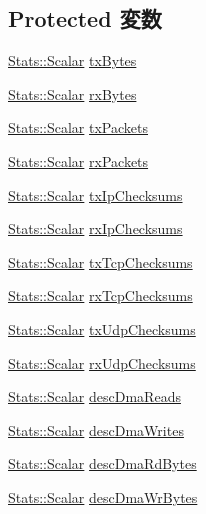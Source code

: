 \subsection*{Protected 変数}
\begin{DoxyCompactItemize}
\item 
\hyperlink{classStats_1_1Scalar}{Stats::Scalar} \hyperlink{classEtherDevice_abbcbcdf8c27d517363ead6a7f6d26e0d}{txBytes}
\item 
\hyperlink{classStats_1_1Scalar}{Stats::Scalar} \hyperlink{classEtherDevice_a715fc1a9e846c381ddd90bd12b0e28d0}{rxBytes}
\item 
\hyperlink{classStats_1_1Scalar}{Stats::Scalar} \hyperlink{classEtherDevice_a954bf8127dea683de5f15cb0e2103657}{txPackets}
\item 
\hyperlink{classStats_1_1Scalar}{Stats::Scalar} \hyperlink{classEtherDevice_a584f3731c2a58f40585474fab9b080b2}{rxPackets}
\item 
\hyperlink{classStats_1_1Scalar}{Stats::Scalar} \hyperlink{classEtherDevice_ab8fd14604893c8e4a3972f2fdf9501e1}{txIpChecksums}
\item 
\hyperlink{classStats_1_1Scalar}{Stats::Scalar} \hyperlink{classEtherDevice_a8ef538bf2e629f31a94678016ee92ddf}{rxIpChecksums}
\item 
\hyperlink{classStats_1_1Scalar}{Stats::Scalar} \hyperlink{classEtherDevice_a5eb11fbceeba64f33c20a6f83d47fa4c}{txTcpChecksums}
\item 
\hyperlink{classStats_1_1Scalar}{Stats::Scalar} \hyperlink{classEtherDevice_a6e12a524415fd313cc9a396fa1f4addb}{rxTcpChecksums}
\item 
\hyperlink{classStats_1_1Scalar}{Stats::Scalar} \hyperlink{classEtherDevice_aa1217365fc3caee57fb3a21d3a51b237}{txUdpChecksums}
\item 
\hyperlink{classStats_1_1Scalar}{Stats::Scalar} \hyperlink{classEtherDevice_a17a288e255ab7c2ef29580d9aa1ddfe5}{rxUdpChecksums}
\item 
\hyperlink{classStats_1_1Scalar}{Stats::Scalar} \hyperlink{classEtherDevice_a869f718813408dc21677a8b4eda22ad7}{descDmaReads}
\item 
\hyperlink{classStats_1_1Scalar}{Stats::Scalar} \hyperlink{classEtherDevice_adc4b53fc1cc0eabdd288107ea65dacef}{descDmaWrites}
\item 
\hyperlink{classStats_1_1Scalar}{Stats::Scalar} \hyperlink{classEtherDevice_ae33ce7a1d1a501ce77ffed2d58b93aee}{descDmaRdBytes}
\item 
\hyperlink{classStats_1_1Scalar}{Stats::Scalar} \hyperlink{classEtherDevice_a63afa49d1b97dd1979180876aa30725f}{descDmaWrBytes}

\end{DoxyCompactItemize}
